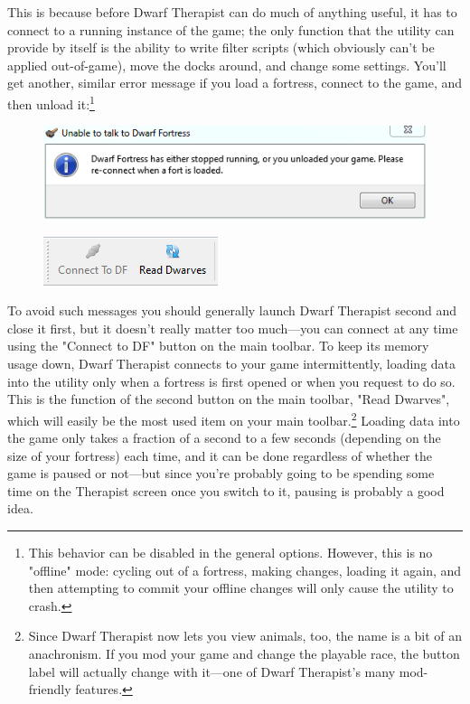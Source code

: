 \documentclass[]{article}
\begin{document}
This is because before Dwarf Therapist can do much of anything useful, it has to connect to a running
instance of the game; the only function that the utility can provide by itself is the ability to write
filter scripts (which obviously can't be applied out-of-game), move the docks around, and change some
settings. You'll get another, similar error message if you load a fortress, connect to the game, and then
unload it:\footnote{This behavior can be disabled in the general options. However, this is no "offline"
mode: cycling out of a fortress, making changes, loading it again, and then attempting to commit your
offline changes will only cause the utility to crash.}

\begin{figure}[h!] \centering
\includegraphics[width=.7\linewidth]{Sec1Fig2}
\end{figure}

\begin{figure}
\vspace{-20pt}
  \begin{center}
    \includegraphics[scale=1]{Sec1Fig3}
  \end{center}
  \vspace{-10pt}
  \end{figure}
  
To avoid such messages you should generally launch Dwarf Therapist second and close it first, but it
doesn't really matter too much---you can connect at any time using the "Connect to DF" button on the
main toolbar. To keep its memory usage down, Dwarf Therapist connects to your game intermittently, loading
data into the utility only when a fortress is first opened or when you request to do so. This is the
function of the second button on the main toolbar, "Read Dwarves", which will easily be the most used
item on your main toolbar.\footnote{Since Dwarf Therapist now lets you view animals, too, the name is a
bit of an anachronism. If you mod your game and change the playable race, the button label will actually
change with it---one of Dwarf Therapist's many mod-friendly features.} Loading data into the game only
takes a fraction of a second to a few seconds (depending on the size of your fortress) each time, and it
can be done regardless of whether the game is paused or not---but since you're probably going to be
spending some time on the Therapist screen once you switch to it, pausing is probably a good idea.
\newpage
\end{document}
